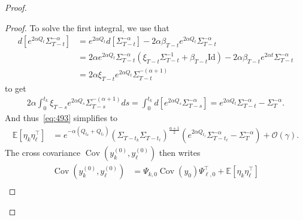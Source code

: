 \documentclass[11pt]{article}
\newcommand{\EE}{\mathbb{E}}
\newcommand{\cov}{\operatorname{Cov}}
\begin{document}
\begin{proof}
\begin{proof}
To solve the first integral, we use that
\begin{align*}
d[e^{2 \alpha Q_t} \Sigma_{T-t}^{-\alpha}] &= e^{2 \alpha Q_t} d[\Sigma_{T-t}^{-\alpha}] - 2 \alpha \beta_{T-t} e^{2 \alpha Q_t} \Sigma_{T-t}^{-\alpha} \\
&=  2 \alpha e^{2 \alpha Q_t} \Sigma_{T-t}^{-\alpha}(\xi_{T-t}\Sigma_{T-t}^{-1} + \beta_{T-t}\text{Id}) - 2 \alpha \beta_{T-t} e^{2 \alpha t} \Sigma_{T-t}^{-\alpha} \\
&= 2 \alpha \xi_{T-t} e^{2 \alpha Q_t} \Sigma_{T-t}^{-(\alpha+1)}
\end{align*}
to get
\begin{align*}
2 \alpha \int_0^{t_k} \xi_{T-s} e^{2 \alpha Q_s} \Sigma_{T-s}^{-(\alpha + 1)} ds  = \int_0^{t_k} d[e^{2 \alpha Q_s} \Sigma_{T-s}^{- \alpha}] = e^{2\alpha Q_t}\Sigma_{T-t}^{-\alpha} - \Sigma_{T}^{-\alpha} .
\end{align*}
And thus~\eqref{eq:493} simplifies to
\begin{align*}
     \EE[\eta_k \eta_{\ell}^\top] &=   e^{-\alpha (Q_{t_k}+Q_{t_\ell})} \left( \Sigma_{T-{t_k}} \Sigma_{T-{t_\ell}}\right)^{\frac{\alpha+1}{2}}  \left( e^{2\alpha Q_{t_\ell}}\Sigma_{T-{t_\ell}}^{-\alpha} - \Sigma_{T}^{-\alpha} \right) + \mathcal{O}(\gamma).
\end{align*}
The cross covariance $\cov(y^{(0)}_k, y^{(0)}_\ell)$ then writes
\begin{align} \label{eq:cross_cov_2}
\cov(y^{(0)}_k, y^{(0)}_\ell) &=  \Psi_{k,0} \cov(y_0) \Psi_{\ell,0}^\top + \EE[\eta_k \eta_{\ell}^\top] \\

\end{align}
\end{proof}
\end{proof}
\end{document}
